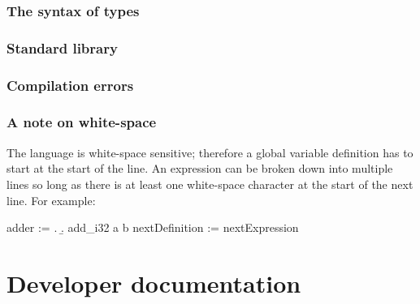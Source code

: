 \documentclass[12pt]{article}
\begin{document}
\subsubsection{The syntax of types}
\subsubsection{Standard library}
\subsubsection{Compilation errors}

\subsubsection{A note on white-space}

The language is white-space sensitive; therefore a global variable definition
has to start at the start of the line. An expression can be broken down into
multiple lines so long as there is at least one white-space character at the
start of the next line. For example:
\begin{verbatim*}
adder := \a. \b.
 add_i32 a
         b
nextDefinition := nextExpression
\end{verbatim*}

\section{Developer documentation}
\end{document}
